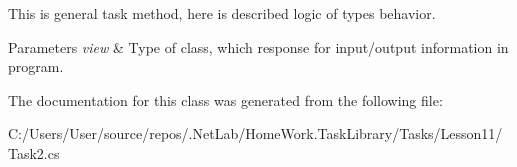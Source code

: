 This is general task method, here is described logic of types behavior. 


\begin{DoxyParams}{Parameters}
{\em view} & Type of class, which response for input/output information in program.\\
\hline
\end{DoxyParams}


The documentation for this class was generated from the following file\+:\begin{DoxyCompactItemize}
\item 
C\+:/\+Users/\+User/source/repos/.\+Net\+Lab/\+Home\+Work.\+Task\+Library/\+Tasks/\+Lesson11/Task2.\+cs\end{DoxyCompactItemize}
